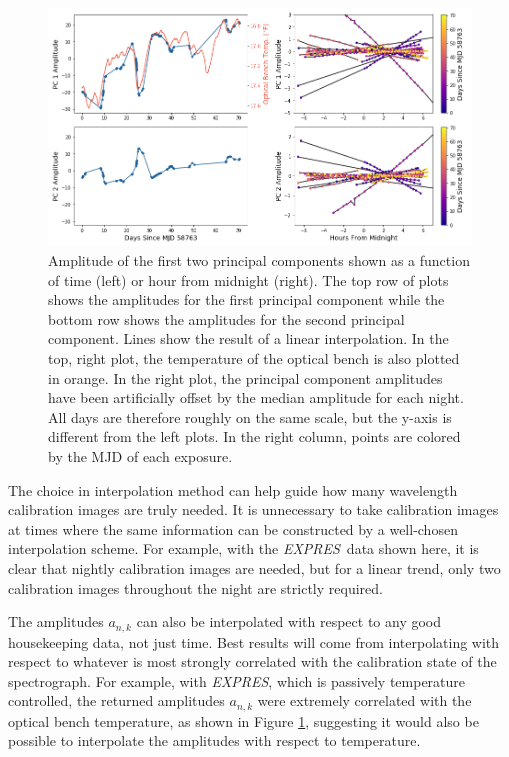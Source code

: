 \documentclass[modern]{aastex63}
\newcommand{\project}[1]{\textsl{#1}}
\newcommand{\acronym}[1]{{\small{#1}}}
\newcommand{\expres}{\project{\acronym{EXPRES}}}
\begin{document}
\begin{figure}[t]
\centering
\includegraphics[width=\textwidth]{Figures/pcAs_byDay.png}
\caption{Amplitude of the first two principal components shown as a function of time (left) or hour from midnight (right).  The top row of plots shows the amplitudes for the first principal component while the bottom row shows the amplitudes for the second principal component.  Lines show the result of a linear interpolation.  In the top, right plot, the temperature of the optical bench is also plotted in orange.  In the right plot, the principal component amplitudes have been artificially offset by the median amplitude for each night.  All days are therefore roughly on the same scale, but the y-axis is different from the left plots.  In the right column, points are colored by the MJD of each exposure.}
\label{fig:nightlyVariation}
\end{figure} 

The choice in interpolation method can help guide how many wavelength calibration images are truly needed.  It is unnecessary to take calibration images at times where the same information can be constructed by a well-chosen interpolation scheme.  For example, with the \expres\ data shown here, it is clear that nightly calibration images are needed, but for a linear trend, only two calibration images throughout the night are strictly required.

The amplitudes $a_{n,k}$ can also be interpolated with respect to any good housekeeping data, not just time.  Best results will come from interpolating with respect to whatever is most strongly correlated with the calibration state of the spectrograph.  For example, with \expres, which is passively temperature controlled, the returned amplitudes $a_{n,k}$ were extremely correlated with the optical bench temperature, as shown in Figure \ref{fig:nightlyVariation}, suggesting it would also be possible to interpolate the amplitudes with respect to temperature.
\end{document}
